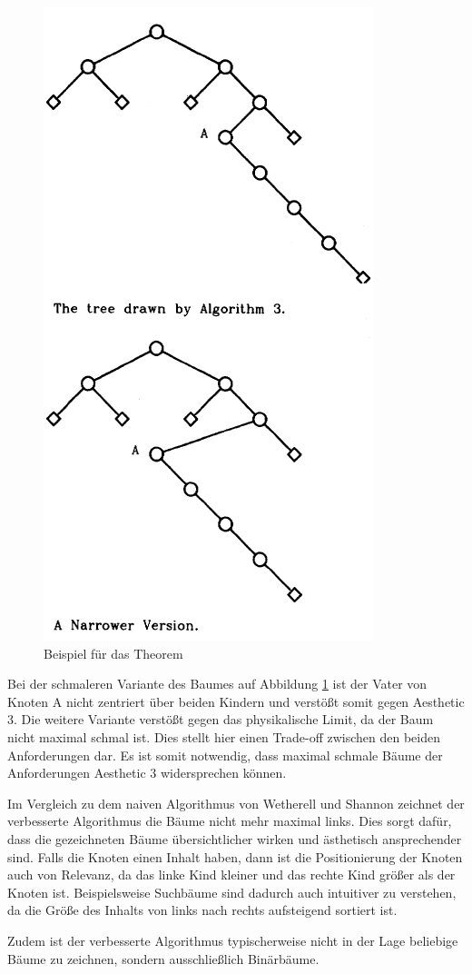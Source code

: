 \begin{figure}[H]
    \centering
    \includegraphics[scale = 0.75]{abbildungen/baum_theorem_uglification}
    \caption{Beispiel für das Theorem \cite[]{q1}}
    \label{pic:baum_theorem_uglification} 
\end{figure}

Bei der schmaleren Variante des Baumes auf Abbildung \ref{pic:baum_theorem_uglification} ist der Vater von Knoten A nicht zentriert
über beiden Kindern und verstößt somit gegen Aesthetic 3. Die weitere Variante verstößt gegen das physikalische Limit, da der Baum nicht
maximal schmal ist. Dies stellt hier einen Trade-off zwischen den beiden Anforderungen dar. Es ist somit notwendig, dass maximal schmale Bäume der
Anforderungen Aesthetic 3 widersprechen können. 

Im Vergleich zu dem naiven Algorithmus von Wetherell und Shannon zeichnet der verbesserte Algorithmus die Bäume nicht mehr maximal links.
Dies sorgt dafür, dass die gezeichneten Bäume übersichtlicher wirken und ästhetisch ansprechender sind. Falls die Knoten einen Inhalt haben, dann
ist die Positionierung der Knoten auch von Relevanz, da das linke Kind kleiner und das rechte Kind größer als der Knoten ist. Beispielsweise
Suchbäume sind dadurch auch intuitiver zu verstehen, da die Größe des Inhalts von links nach rechts aufsteigend sortiert ist. 

Zudem ist der verbesserte Algorithmus typischerweise nicht in der Lage beliebige Bäume zu zeichnen, sondern ausschließlich Binärbäume.
